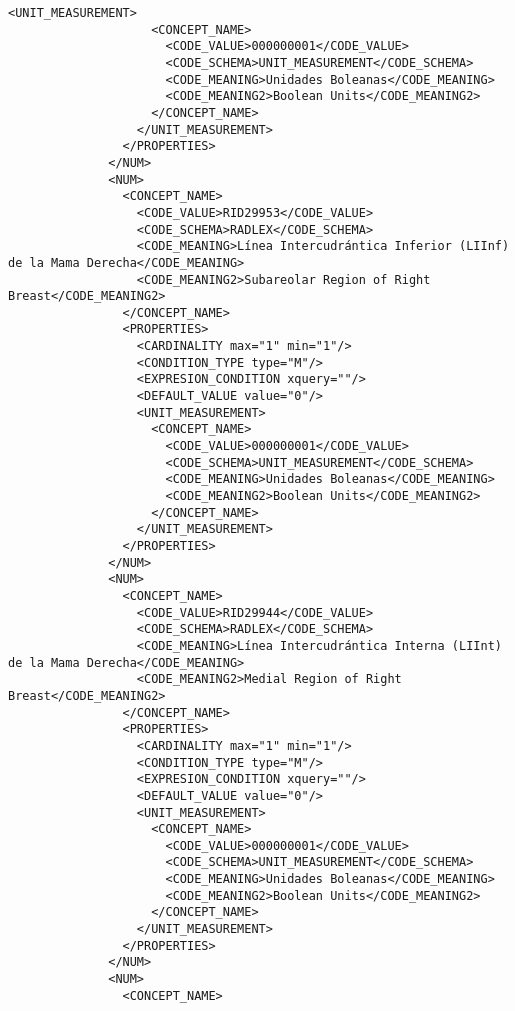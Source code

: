\begin{lstlisting}[label=some-code,caption=Some Code]
                  <UNIT_MEASUREMENT>
                    <CONCEPT_NAME>
                      <CODE_VALUE>000000001</CODE_VALUE>
                      <CODE_SCHEMA>UNIT_MEASUREMENT</CODE_SCHEMA>
                      <CODE_MEANING>Unidades Boleanas</CODE_MEANING>
                      <CODE_MEANING2>Boolean Units</CODE_MEANING2>
                    </CONCEPT_NAME>
                  </UNIT_MEASUREMENT>
                </PROPERTIES>
              </NUM>
              <NUM>
                <CONCEPT_NAME>
                  <CODE_VALUE>RID29953</CODE_VALUE>
                  <CODE_SCHEMA>RADLEX</CODE_SCHEMA>
                  <CODE_MEANING>Línea Intercudrántica Inferior (LIInf) de la Mama Derecha</CODE_MEANING>
                  <CODE_MEANING2>Subareolar Region of Right Breast</CODE_MEANING2>
                </CONCEPT_NAME>
                <PROPERTIES>
                  <CARDINALITY max="1" min="1"/>
                  <CONDITION_TYPE type="M"/>
                  <EXPRESION_CONDITION xquery=""/>
                  <DEFAULT_VALUE value="0"/>
                  <UNIT_MEASUREMENT>
                    <CONCEPT_NAME>
                      <CODE_VALUE>000000001</CODE_VALUE>
                      <CODE_SCHEMA>UNIT_MEASUREMENT</CODE_SCHEMA>
                      <CODE_MEANING>Unidades Boleanas</CODE_MEANING>
                      <CODE_MEANING2>Boolean Units</CODE_MEANING2>
                    </CONCEPT_NAME>
                  </UNIT_MEASUREMENT>
                </PROPERTIES>
              </NUM>
              <NUM>
                <CONCEPT_NAME>
                  <CODE_VALUE>RID29944</CODE_VALUE>
                  <CODE_SCHEMA>RADLEX</CODE_SCHEMA>
                  <CODE_MEANING>Línea Intercudrántica Interna (LIInt) de la Mama Derecha</CODE_MEANING>
                  <CODE_MEANING2>Medial Region of Right Breast</CODE_MEANING2>
                </CONCEPT_NAME>
                <PROPERTIES>
                  <CARDINALITY max="1" min="1"/>
                  <CONDITION_TYPE type="M"/>
                  <EXPRESION_CONDITION xquery=""/>
                  <DEFAULT_VALUE value="0"/>
                  <UNIT_MEASUREMENT>
                    <CONCEPT_NAME>
                      <CODE_VALUE>000000001</CODE_VALUE>
                      <CODE_SCHEMA>UNIT_MEASUREMENT</CODE_SCHEMA>
                      <CODE_MEANING>Unidades Boleanas</CODE_MEANING>
                      <CODE_MEANING2>Boolean Units</CODE_MEANING2>
                    </CONCEPT_NAME>
                  </UNIT_MEASUREMENT>
                </PROPERTIES>
              </NUM>
              <NUM>
                <CONCEPT_NAME>

\end{lstlisting}
